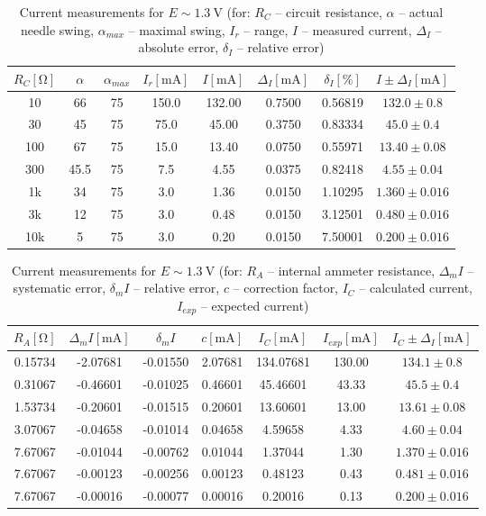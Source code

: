\begin{table}[H]
	\centering
	\begin{tabular}{ c | c | c | c | c | c | c | c }
		$R_C [\unit{\ohm}]$& $\alpha$ & $\alpha_{max}$ & $I_r [\unit{\milli\ampere}]$ & $I [\unit{\milli\ampere}]$ & $\Delta_I [\unit{\milli\ampere}]$ & $\delta_I [\unit{\percent}]$ & $I \pm \Delta_I [\unit{\milli\ampere}]$\\
		\hline
		10  & 66 & 75 & 150.0 & 132.00 & 0.7500 & 0.56819 & $132.0 \pm 0.8$ \\
		30  & 45 & 75 & 75.0 & 45.00 & 0.3750 & 0.83334 & $45.0 \pm 0.4$ \\
		100  & 67 & 75 & 15.0 & 13.40 & 0.0750 & 0.55971 &  $13.40\pm 0.08$\\
		300  & 45.5 & 75 & 7.5 & 4.55 & 0.0375 & 0.82418 & $4.55 \pm 0.04$\\
		1k  & 34 & 75 & 3.0 & 1.36 & 0.0150 & 1.10295 & $1.360\pm 0.016$\\
		3k  & 12 & 75 & 3.0 & 0.48 & 0.0150 & 3.12501 & $0.480\pm 0.016$\\
		10k  & 5 & 75 & 3.0 & 0.20 & 0.0150 & 7.50001 & $0.200\pm 0.016$\\
	\end{tabular}
	\caption{Current measurements for $E\sim\SI{1.3}{\volt}$ (for: $R_C$ -- circuit resistance, $\alpha$ -- actual needle swing, $\alpha_{max}$ -- maximal swing, $I_r$ -- range, $I$ -- measured current, $\Delta_I$ --absolute error, $\delta_I$ -- relative error)}
	\label{tab:direct_analog_1}
\end{table}

\begin{table}[H]
	\centering
	\begin{tabular}{c | c | c | c | c | c | c}
		$R_A [\unit{\ohm}]$ & $\Delta_m I [\unit{\milli\ampere}]$ & $\delta_m I$ & $c [\unit{\milli\ampere}]$ & $I_C [\unit{\milli\ampere}]$ & $I_{exp} [\unit{\milli\ampere}]$ & $I_C \pm \Delta_I [\unit{\milli\ampere}]$\\
		\hline
		0.15734 & -2.07681 & -0.01550 & 2.07681 & 134.07681 &130.00 & $134.1\pm 0.8$\\
		0.31067 & -0.46601 & -0.01025 & 0.46601 & 45.46601 & 43.33 & $45.5\pm 0.4$\\
		1.53734 & -0.20601 & -0.01515 & 0.20601 & 13.60601  & 13.00 & $13.61\pm 0.08$\\
		3.07067 & -0.04658 & -0.01014 & 0.04658 & 4.59658 & 4.33 & $4.60\pm 0.04$\\
		7.67067 & -0.01044 & -0.00762 & 0.01044 & 1.37044 & 1.30 & $1.370\pm 0.016$\\
		7.67067 & -0.00123 & -0.00256 & 0.00123 & 0.48123 & 0.43 & $0.481\pm 0.016$\\
		7.67067 & -0.00016 & -0.00077 & 0.00016 & 0.20016 & 0.13& $0.200\pm 0.016$\\
	\end{tabular}
	\caption{Current measurements for $E\sim\SI{1.3}{\volt}$ (for: $R_A$ -- internal ammeter resistance, $\Delta_m I$ -- systematic error, $\delta_m I$ -- relative error, $c$ -- correction factor, $I_C$ -- calculated current,  $I_{exp}$ -- expected current)}
	\label{tab:direct_analog_2}
\end{table}

